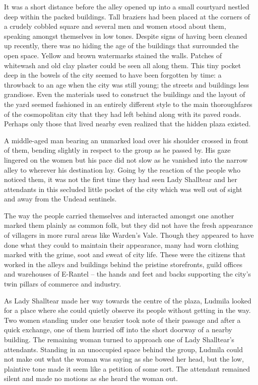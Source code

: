  

It was a short distance before the alley opened up into a small courtyard nestled deep within the packed buildings. Tall braziers had been placed at the corners of a crudely cobbled square and several men and women stood about them, speaking amongst themselves in low tones. Despite signs of having been cleaned up recently, there was no hiding the age of the buildings that surrounded the open space. Yellow and brown watermarks stained the walls. Patches of whitewash and old clay plaster could be seen all along them. This tiny pocket deep in the bowels of the city seemed to have been forgotten by time: a throwback to an age when the city was still young; the streets and buildings less grandiose. Even the materials used to construct the buildings and the layout of the yard seemed fashioned in an entirely different style to the main thoroughfares of the cosmopolitan city that they had left behind along with its paved roads. Perhaps only those that lived nearby even realized that the hidden plaza existed.

 

A middle-aged man bearing an unmarked load over his shoulder crossed in front of them, bending slightly in respect to the group as he passed by. His gaze lingered on the women but his pace did not slow as he vanished into the narrow alley to wherever his destination lay. Going by the reaction of the people who noticed them, it was not the first time they had seen Lady Shalltear and her attendants in this secluded little pocket of the city which was well out of sight and away from the Undead sentinels.

 

The way the people carried themselves and interacted amongst one another marked them plainly as common folk, but they did not have the fresh appearance of villagers in more rural areas like Warden’s Vale. Though they appeared to have done what they could to maintain their appearance, many had worn clothing marked with the grime, soot and sweat of city life. These were the citizens that worked in the alleys and buildings behind the pristine storefronts, guild offices and warehouses of E-Rantel – the hands and feet and backs supporting the city’s twin pillars of commerce and industry.

 

As Lady Shalltear made her way towards the centre of the plaza, Ludmila looked for a place where she could quietly observe its people without getting in the way. Two women standing under one brazier took note of their passage and after a quick exchange, one of them hurried off into the short doorway of a nearby building. The remaining woman turned to approach one of Lady Shalltear’s attendants. Standing in an unoccupied space behind the group, Ludmila could not make out what the woman was saying as she bowed her head, but the low, plaintive tone made it seem like a petition of some sort. The attendant remained silent and made no motions as she heard the woman out.

